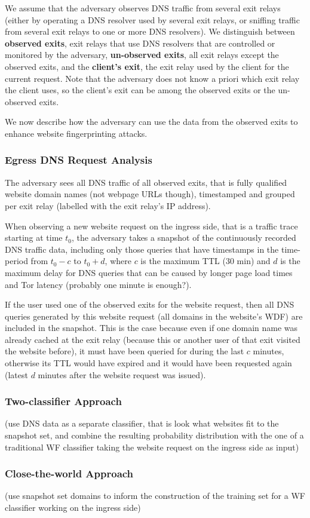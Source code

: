 We assume that the adversary observes DNS traffic from several exit
relays (either by operating a DNS resolver used by several exit relays,
or sniffing traffic from several exit relays to one or more DNS
resolvers).
%
We distinguish between \textbf{observed exits}, \ie exit relays that use
DNS resolvers that are controlled or monitored by the adversary,
\textbf{un-observed exits}, \ie all exit relays except the observed
exits, and the \textbf{client's exit}, \ie the exit relay used by the
client for the current request.
%
Note that the adversary does not know a priori which exit relay the
client uses, so the client's exit can be among the observed exits or the
un-observed exits.

%
We now describe how the adversary can use the data from the observed
exits to enhance website fingerprinting attacks.


\subsubsection{Egress DNS Request Analysis}

The adversary sees all DNS traffic of all observed exits, that is fully
qualified website domain names (not webpage URLs though), timestamped
and grouped per exit relay (\eg labelled with the exit relay's IP
address).

When observing a new website request on the ingress side, that is a
traffic trace starting at time $t_0$, the adversary takes a snapshot
of the continuously recorded DNS traffic data, including only those queries
that have timestamps in the time-period from $t_0 - c$ to $t_0 + d$,
where $c$ is the maximum TTL (30 min) and $d$ is the maximum delay
for DNS queries that can be caused by longer page load times and Tor
latency (probably one minute is enough?).

If the user used one of the observed exits for the website request, then
all DNS queries generated by this website request (\ie all domains in
the website's WDF) are included in the snapshot. This is the case
because even if one domain name was already cached at the exit relay
(because this or another user of that exit visited the website before),
it must have been queried for during the last $c$ minutes, otherwise its
TTL would have expired and it would have been requested again (latest
$d$ minutes after the website request was issued).

\subsubsection{Two-classifier Approach}
(use DNS data as a separate classifier, that is look what websites fit
to the snapshot set, and combine the resulting probability distribution
with the one of a traditional WF classifier taking the website request
on the ingress side as input)


\subsubsection{Close-the-world Approach}
(use snapshot set domains to inform the construction of the training set
for a WF classifier working on the ingress side)
